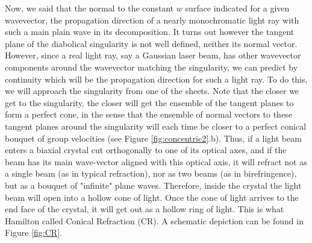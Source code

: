 \documentclass[11pt, a4paper, twoside]{article} %
\begin{document}
Now, we said that the normal to the constant $w$ surface indicated for a given wavevector, the propagation direction of a nearly monochromatic light ray with such a main plain wave in its decomposition. It turns out however the tangent plane of the diabolical singularity is not well defined, neither its normal vector. However, since a real light ray, say a Gaussian laser beam, has other wavevector components around the wavevector matching the singularity, we can predict by continuity which will be the propagation direction for such a light ray. To do this, we will approach the singularity from one of the sheets. Note that the closer we get to the singularity, the closer will get the ensemble of the tangent planes to form a perfect cone, in the sense that the ensemble of normal vectors to these tangent planes around the singularity will each time be closer to a perfect conical bouquet of group velocities (see Figure \ref{fig:concentric2}.b). Thus, if a light beam enters a biaxial crystal cut orthogonally to one of its optical axes, and if the beam has its main wave-vector aligned with this optical axis, it will refract not as a single beam (as in typical refraction), nor as two beams (as in birefringence), but as a bouquet of "infinite" plane waves. Therefore, inside the crystal the light beam will open into a hollow cone of light. Once the cone of light arrives to the end face of the crystal, it will get out as a hollow ring of light. This is what Hamilton called Conical Refraction (CR). A schematic depiction can be found in Figure \ref{fig:CR}.
\end{document}

